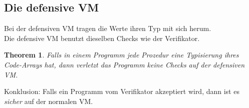 \documentclass[german,10pt, a4paper, twocolumn]{scrartcl}
\newtheorem{theorem}{Theorem}[section]
\theoremstyle{definition}
\theoremstyle{remark}
\begin{document}
\subsection{Die defensive VM}

Bei der defensiven VM tragen die Werte ihren Typ mit sich herum.\\

Die defensive VM benutzt dieselben Checks wie der Verifikator.

\begin{theorem}
	Falls in einem Programm jede Prozedur eine Typisierung ihres Code-Arrays hat, dann verletzt das Programm keine Checks auf der defensiven VM.
\end{theorem}

Konklusion: Falls ein Programm vom Verifikator akzeptiert wird, dann ist es \textit{sicher} auf der normalen VM.
\end{document}
